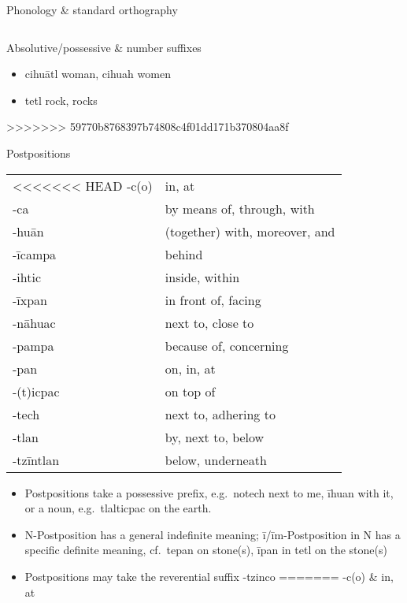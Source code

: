 \documentclass[12pt]{beamer}
\newcommand{\nah}[1]{\textcolor{nahgrn}{#1}}
\newcommand{\trs}[1]{\textcolor{nahblu}{#1}}
\begin{document}
\begin{frame}
\begin{columns}[t]
\begin{column}{.22\linewidth}
\begin{block}{Phonology \& standard orthography}
\begin{threeparttable}
\begin{tablenotes}
\begin{frame}
\begin{columns}[t]
\begin{column}{.23\linewidth}
\begin{block}{Absolutive/possessive \& number suffixes}
\begin{itemize}
\begin{itemize}
                  \item \nah{cihuātl} \trs{woman}, \nah{cihuah} \trs{women}
                  \item \nah{tetl} \trs{rock, rocks}
                \end{itemize}
>>>>>>> 59770b8768397b74808c4f01dd171b370804aa8f
        \end{itemize}
      \end{block}
      \begin{block}{Postpositions}
        \begin{tabular}{ll}
<<<<<<< HEAD
          \nah{-c(o)} & \trs{in, at} \\
          \nah{-ca} & \trs{by means of, through, with} \\
          \nah{-huān} & \trs{(together) with, moreover, and} \\
          \nah{-īcampa} & \trs{behind} \\
          \nah{-ihtic} & \trs{inside, within} \\
          \nah{-īxpan} & \trs{in front of, facing} \\
          \nah{-nāhuac} & \trs{next to, close to} \\
          \nah{-pampa} & \trs{because of, concerning} \\
          \nah{-pan} & \trs{on, in, at} \\
          \nah{-(t)icpac} & \trs{on top of} \\
          \nah{-tech} & \trs{next to, adhering to} \\
          \nah{-tlan} & \trs{by, next to, below} \\
          \nah{-tzīntlan} & \trs{below, underneath} \\
        \end{tabular}%
        \begin{itemize}
        \item Postpositions take a possessive prefix, e.g.~\nah{notech} \trs{next to me}, \nah{īhuan} \trs{with it}, or a noun, e.g.~\nah{tlalticpac} \trs{on the earth}.
        \item         N-Postposition has a general indefinite meaning; \nah{ī/īm}-Postposition \nah{in} N has a specific definite meaning, cf.~\nah{tepan} \trs{on stone(s)}, \nah{īpan in tetl} \trs{on the stone(s)}
        \item Postpositions may take the reverential suffix \nah{-tzinco}
=======
          \nah{-c(o)}     & \trs{in, at}                         \\

\end{itemize}
\end{block}
\end{column}
\end{columns}
\end{frame}
\end{tablenotes}
\end{threeparttable}
\end{block}
\end{column}
\end{columns}
\end{frame}
\end{document}
